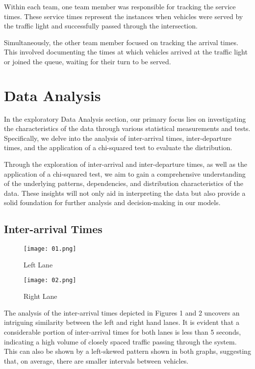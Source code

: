 \documentclass[12pt, a4paper]{article}
\begin{document}
	Within each team, one team member was responsible for tracking the service times. These service times represent the instances when vehicles were served by the traffic light and successfully passed through the intersection.
	
	Simultaneously, the other team member focused on tracking the arrival times. This involved documenting the times at which vehicles arrived at the traffic light or joined the queue, waiting for their turn to be served. 
	
	\section{Data Analysis}
	In the exploratory Data Analysis section, our primary focus lies on investigating the characteristics of the data through various statistical measurements and tests. Specifically, we delve into the analysis of inter-arrival times, inter-departure times, and the application of a chi-squared test to evaluate the distribution.
	
	Through the exploration of inter-arrival and inter-departure times, as well as the application of a chi-squared test, we aim to gain a comprehensive understanding of the underlying patterns, dependencies, and distribution characteristics of the data. These insights will not only aid in interpreting the data but also provide a solid foundation for further analysis and decision-making in our models.
	
	\subsection{Inter-arrival Times}
	\begin{figure}
		\centering
		\begin{minipage}[b]{0.48\textwidth}
			\texttt{[image: 01.png]}
			\caption{Left Lane}
		\end{minipage}
		\hfill
		\begin{minipage}[b]{0.48\textwidth}
			\texttt{[image: 02.png]}
			\caption{Right Lane}
		\end{minipage}
	\end{figure}
	
	The analysis of the inter-arrival times depicted in Figures 1 and 2 uncovers an intriguing similarity between the left and right hand lanes. It is evident that a considerable portion of inter-arrival times for both lanes is less than 5 seconds, indicating a high volume of closely spaced traffic passing through the system. This can also be shown by a left-skewed pattern shown in both graphs, suggesting that, on average, there are smaller intervals between vehicles.
	
\end{document}
